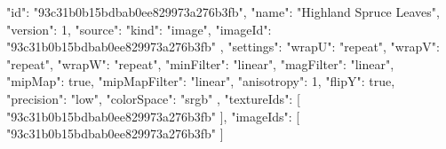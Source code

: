 {
  "id": "93c31b0b15bdbab0ee829973a276b3fb",
  "name": "Highland Spruce Leaves",
  "version": 1,
  "source": {
    "kind": "image",
    "imageId": "93c31b0b15bdbab0ee829973a276b3fb"
  },
  "settings": {
    "wrapU": "repeat",
    "wrapV": "repeat",
    "wrapW": "repeat",
    "minFilter": "linear",
    "magFilter": "linear",
    "mipMap": true,
    "mipMapFilter": "linear",
    "anisotropy": 1,
    "flipY": true,
    "precision": "low",
    "colorSpace": "srgb"
  },
  "textureIds": [
    "93c31b0b15bdbab0ee829973a276b3fb"
  ],
  "imageIds": [
    "93c31b0b15bdbab0ee829973a276b3fb"
  ]
}
